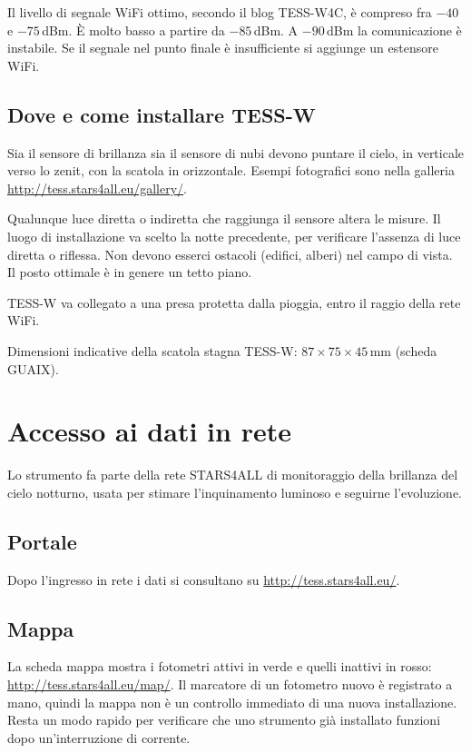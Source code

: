 \documentclass[11pt,a4paper]{report}
\begin{document}
Il livello di segnale WiFi ottimo, secondo il blog TESS-W4C, è compreso fra $-40$ e $-75$\,dBm. È molto basso a partire da $-85$\,dBm. A $-90$\,dBm la comunicazione è instabile. Se il segnale nel punto finale è insufficiente si aggiunge un estensore WiFi.

\section{Dove e come installare TESS-W}

Sia il sensore di brillanza sia il sensore di nubi devono puntare il cielo, in verticale verso lo zenit, con la scatola in orizzontale. Esempi fotografici sono nella galleria \url{http://tess.stars4all.eu/gallery/}.

Qualunque luce diretta o indiretta che raggiunga il sensore altera le misure. Il luogo di installazione va scelto la notte precedente, per verificare l'assenza di luce diretta o riflessa. Non devono esserci ostacoli (edifici, alberi) nel campo di vista. Il posto ottimale è in genere un tetto piano.

TESS-W va collegato a una presa protetta dalla pioggia, entro il raggio della rete WiFi.

Dimensioni indicative della scatola stagna TESS-W: $87 \times 75 \times 45$\,mm (scheda GUAIX).

\chapter{Accesso ai dati in rete}

Lo strumento fa parte della rete STARS4ALL di monitoraggio della brillanza del cielo notturno, usata per stimare l'inquinamento luminoso e seguirne l'evoluzione.

\section{Portale}

Dopo l'ingresso in rete i dati si consultano su \url{http://tess.stars4all.eu/}.

\section{Mappa}

La scheda mappa mostra i fotometri attivi in verde e quelli inattivi in rosso: \url{http://tess.stars4all.eu/map/}. Il marcatore di un fotometro nuovo è registrato a mano, quindi la mappa non è un controllo immediato di una nuova installazione. Resta un modo rapido per verificare che uno strumento già installato funzioni dopo un'interruzione di corrente.
\end{document}
